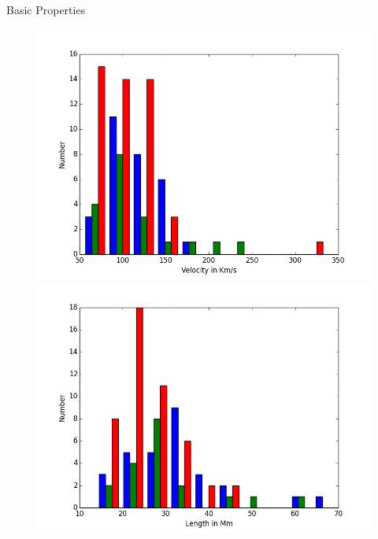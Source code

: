\documentclass{beamer}
\begin{document}
	\begin{frame}{Basic Properties}
		\begin{figure}
				\includegraphics[scale=0.20]{Figs/vel_hist.png}
				\includegraphics[scale=0.20]{Figs/len_hist.png}\\
				

\end{figure}
\end{frame}
\end{document}
